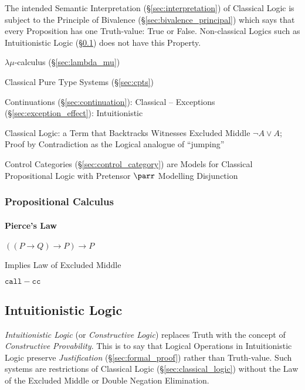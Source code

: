 The intended Semantic Interpretation (\S\ref{sec:interpretation}) of
Classical Logic is subject to the Principle of Bivalence
(\S\ref{sec:bivalence_principal}) which says that every Proposition
has one Truth-value: True or False. Non-classical Logics such as
Intuitionistic Logic (\S\ref{sec:intuitionistic_logic}) does not have
this Property.

\fist $\lambda\mu$-calculus (\S\ref{sec:lambda_mu})

\fist Classical Pure Type Systems (\S\ref{sec:cpts})


Continuations (\S\ref{sec:continuation}): Classical -- Exceptions
(\S\ref{sec:exception_effect}): Intuitionistic

Classical Logic: a Term that Backtracks Witnesses Excluded Middle
$\neg A \vee A$; Proof by Contradiction as the Logical analogue of
``jumping''

Control Categories (\S\ref{sec:control_category}) are Models for
Classical Propositional Logic with Pretensor $\parr$ Modelling
Disjunction



\subsubsection{Propositional Calculus}
\label{sec:propositional_calculus}

\paragraph{Pierce's Law}\label{sec:pierces_law}\hfill

$((P \rightarrow Q) \rightarrow P) \rightarrow P$

Implies Law of Excluded Middle

$\mathtt{call-cc}$ %



\subsection{Intuitionistic Logic}\label{sec:intuitionistic_logic}

\emph{Intuitionistic Logic} (or \emph{Constructive Logic}) replaces
Truth with the concept of \emph{Constructive Provability}. This is to
say that Logical Operations in Intuitionistic Logic preserve
\emph{Justification} (\S\ref{sec:formal_proof}) rather than
Truth-value. Such systems are restrictions of Classical Logic
(\S\ref{sec:classical_logic}) without the Law of the Excluded Middle
or Double Negation Elimination.

